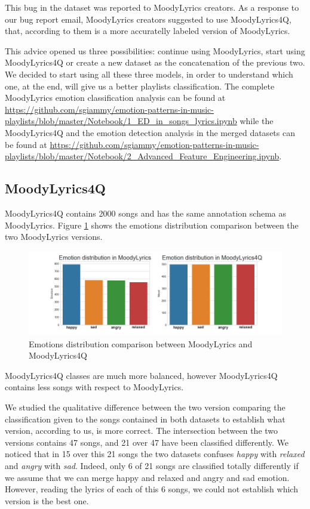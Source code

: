 This bug in the dataset was reported to MoodyLyrics creators. As a response to our bug report email, MoodyLyrics creators suggested to use MoodyLyrics4Q\cite{moodylyrics4q}, that, according to them is a more accuratelly labeled version of MoodyLyrics.\par

This advice opened us three possibilities: continue using MoodyLyrics, start using MoodyLyrics4Q or create a new dataset as the concatenation of the previous two. We decided to start using all these three models, in order to understand which one, at the end, will give us a better playlists classification. The complete MoodyLyrics emotion classification analysis can be found at \url{https://github.com/sgiammy/emotion-patterns-in-music-playlists/blob/master/Notebook/1_ED_in_songs_lyrics.ipynb} while the MoodyLyrics4Q and the emotion detection analysis in the merged datasets can be found at \url{https://github.com/sgiammy/emotion-patterns-in-music-playlists/blob/master/Notebook/2_Advanced_Feature_Engineering.ipynb}.


\subsection{MoodyLyrics4Q}
MoodyLyrics4Q contains 2000 songs and has the same annotation schema as MoodyLyrics. Figure \ref{fig:stats}
shows the emotions distribution comparison between the two MoodyLyrics versions.

\begin{figure}[H]
\centering
\includegraphics[width=1.1\textwidth]{./chapters/chapter4/images/Stats.png}
\caption{Emotions distribution comparison between MoodyLyrics and MoodyLyrics4Q}
\label{fig:stats}
\end{figure}

MoodyLyrics4Q classes are much more balanced, however MoodyLyrics4Q contains less songs with respect to MoodyLyrics. \par
We studied the qualitative difference between the two version comparing the classification given to the songs contained in both datasets to establish what version, according to us, is more correct. The intersection between the two versions contains 47 songs, and 21 over 47 have been classified differently. We noticed that in 15 over this 21 songs the two datasets confuses \textit{happy} with \textit{relaxed} and \textit{angry} with \textit{sad}. Indeed, only 6 of 21 songs are classified totally differently if we assume that we can merge happy and relaxed and angry and sad emotion. However, reading the lyrics of each of this 6 songs, we could not establish which version is the best one.


